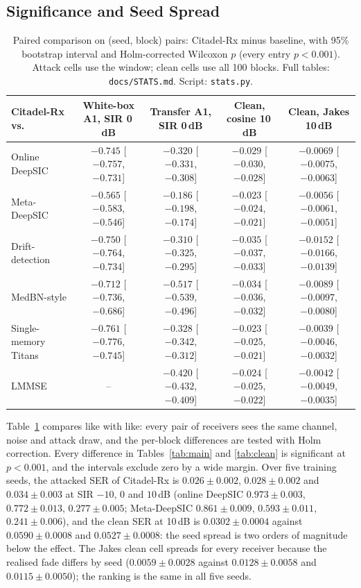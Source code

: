 \documentclass[journal]{IEEEtran}
\begin{document}
\subsection{Significance and Seed Spread}
\begin{table}[t]
\centering\caption{Paired comparison on (seed, block) pairs: Citadel-Rx minus baseline,
with 95\% bootstrap interval and Holm-corrected Wilcoxon $p$ (every entry $p<0.001$).
Attack cells use the window; clean cells use all 100 blocks. Full tables:
\texttt{docs/STATS.md}. Script: \texttt{stats.py}.}\label{tab:paired}
\scriptsize
\begin{tabular}{@{}lcccc@{}}
\toprule
Citadel-Rx vs. & White-box A1, SIR 0\,dB & Transfer A1, SIR 0\,dB & Clean, cosine 10\,dB & Clean, Jakes 10\,dB\\
\midrule
Online DeepSIC & $-0.745$ [$-0.757$, $-0.731$] & $-0.320$ [$-0.331$, $-0.308$] & $-0.029$ [$-0.030$, $-0.028$] & $-0.0069$ [$-0.0075$, $-0.0063$]\\
Meta-DeepSIC & $-0.565$ [$-0.583$, $-0.546$] & $-0.186$ [$-0.198$, $-0.174$] & $-0.023$ [$-0.024$, $-0.021$] & $-0.0056$ [$-0.0061$, $-0.0051$]\\
Drift-detection & $-0.750$ [$-0.764$, $-0.734$] & $-0.310$ [$-0.325$, $-0.295$] & $-0.035$ [$-0.037$, $-0.033$] & $-0.0152$ [$-0.0166$, $-0.0139$]\\
MedBN-style & $-0.712$ [$-0.736$, $-0.686$] & $-0.517$ [$-0.539$, $-0.496$] & $-0.034$ [$-0.036$, $-0.032$] & $-0.0089$ [$-0.0097$, $-0.0080$]\\
Single-memory Titans & $-0.761$ [$-0.776$, $-0.745$] & $-0.328$ [$-0.342$, $-0.312$] & $-0.023$ [$-0.025$, $-0.021$] & $-0.0039$ [$-0.0046$, $-0.0032$]\\
LMMSE & -- & $-0.420$ [$-0.432$, $-0.409$] & $-0.024$ [$-0.025$, $-0.022$] & $-0.0042$ [$-0.0049$, $-0.0035$]\\
\bottomrule
\end{tabular}
\end{table}
Table~\ref{tab:paired} compares like with like: every pair of receivers sees the same
channel, noise and attack draw, and the per-block differences are tested with Holm
correction. Every difference in Tables~\ref{tab:main} and \ref{tab:clean} is significant
at $p<0.001$, and the intervals exclude zero by a wide margin.
Over five training seeds, the attacked SER of Citadel-Rx is $0.026\pm0.002$,
$0.028\pm0.002$ and $0.034\pm0.003$ at SIR $-10$, $0$ and $10$\,dB (online DeepSIC
$0.973\pm0.003$, $0.772\pm0.013$, $0.277\pm0.005$; Meta-DeepSIC $0.861\pm0.009$,
$0.593\pm0.011$, $0.241\pm0.006$), and the clean SER at 10\,dB is $0.0302\pm0.0004$ against
$0.0590\pm0.0008$ and $0.0527\pm0.0008$: the seed spread is two orders of magnitude below
the effect. The Jakes clean cell spreads for every receiver because the realised fade
differs by seed ($0.0059\pm0.0028$ against $0.0128\pm0.0058$ and $0.0115\pm0.0050$); the
ranking is the same in all five seeds.
\end{document}
